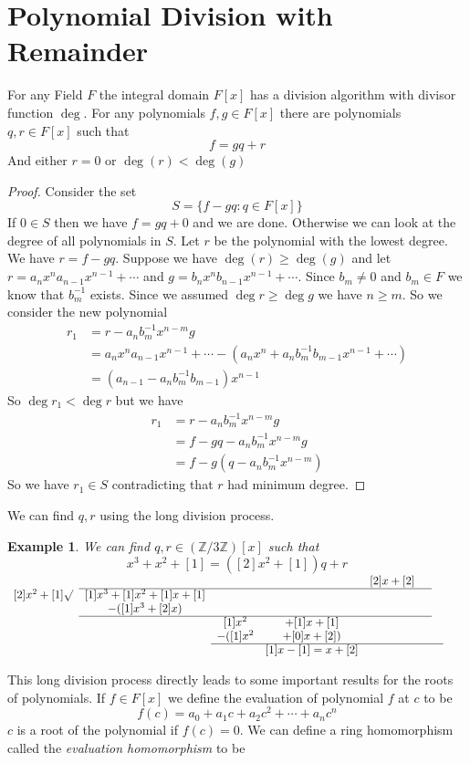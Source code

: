\documentclass[16pt,a4paper]{article}
\newtheorem{example}{Example}
\theoremstyle{definition}
\newcommand{\Z}{\mathbb{Z}}
\begin{document}
\section{Polynomial Division with Remainder}
\begin{thm}{}{}
For any Field $F$ the integral domain $F[x]$ has a division algorithm with divisor function $\deg$. For any polynomials $f,g\in F[x]$ there are polynomials $q,r \in F[x]$ such that 
\[f=gq+r\]
And either $r=0$ or $\deg(r)<\deg(g)$  
\end{thm}

\begin{proof}
Consider the set 
\[S=\{f-gq : q\in F[x]\}\]
If $0\in S$ then we have $f=gq+0$ and we are done. Otherwise we can look at the degree of all polynomials in $S$. Let $r$ be the polynomial with the lowest degree. We have $r=f-gq$. Suppose we have $\deg(r)\geq \deg(g)$ and let $r=a_nx^n a_{n-1}x^{n-1}+\cdots$ and $g=b_nx^n b_{n-1}x^{n-1}+\cdots$. Since $b_m\neq 0$ and $b_m\in F$ we know that $b_{m}^{-1}$ exists. Since we assumed $\deg r \geq \deg g$ we have $n\geq m$. So we consider the new polynomial 
\begin{align*}
r_1 &= r-a_nb^{-1}_mx^{n-m}g \\
& = a_nx^n a_{n-1}x^{n-1}+\cdots - (a_nx^n + a_{n}b_{m}^{-1}b_{m-1}x^{n-1}+\cdots)\\
&= (a_{n-1}-a_{n}b_{m}^{-1}b_{m-1})x^{n-1}
\end{align*}
So $\deg r_1 < \deg r$ but we have 
\begin{align*}
r_1 &= r-a_nb^{-1}_mx^{n-m}g\\
&= f-gq-a_nb^{-1}_mx^{n-m}g\\
&= f-g(q-a_nb^{-1}_mx^{n-m})
\end{align*}
So we have $r_1\in S$ contradicting that $r$ had minimum degree. 
\end{proof}
We can find $q,r$ using the long division process. 
\begin{example}
We can find $q,r\in (\Z/3\Z)[x]$ such that 
\[x^3+x^2+[1] = ([2]x^2+[1])q+r\]
$\begin{array}{ccccccccccc}
& & & & & [2]x+[2] &\\
\cline{3-7}
\multicolumn{2}{r}{[2]x^2 + [1] \surd}
&[1]x^3+[1]x^2 + [1]x+[1]& \\
& & -([1]x^3+[2]x)& & & & \\
\cline{3-7}
& & &[1]x^2&+[1]x+[1] & & & & & \\
& & &-([1]x^2& + [0]x+ [2]) & & & \\
\cline{4-8}
& & & & [1]x -[1] = x+[2] & & \\
\end{array}$
\end{example}
This long division process directly leads to some important results for the roots of polynomials. If $f\in F[x]$ we define the evaluation of polynomial $f$ at $c$ to be 
\[f(c) = a_0 + a_1c + a_2c^2 + \cdots + a_nc^n\] 
$c$ is a root of the polynomial if $f(c) = 0$. We can define a ring homomorphism called the \emph{evaluation homomorphism} to be
\end{document}
